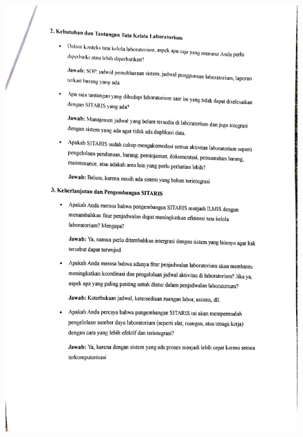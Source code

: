 \begin{figure}[h]
	\centering
	\includegraphics[width=0.82\linewidth]{konten/gambar/wawancara/wawancara_2.jpg}

	\label{fig:hasil-wawancara}
\end{figure}

